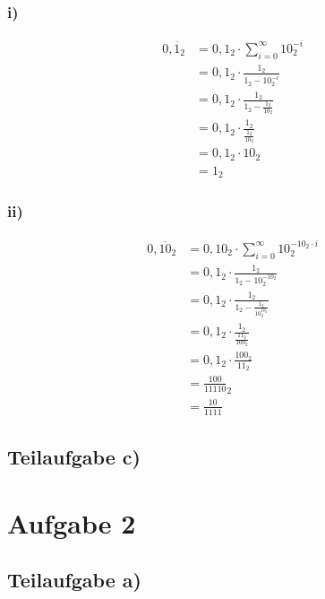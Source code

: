 \documentclass{llncs}
\begin{document}
\subsubsection*{i)}

\begin{align*}
0,\overline{1}_2 &= 0,1_2 \cdot \sum_{i=0}^{\infty} 10^{-i}_2 \\
               &= 0,1_2 \cdot \frac{1_2}{1_2-10^{-i}_2} \\
               &= 0,1_2 \cdot \frac{1_2}{1_2-\frac{1_2}{10_2}} \\
               &= 0,1_2 \cdot \frac{1_2}{\frac{1_2}{10_2}} \\
               &= 0,1_2 \cdot 10_2 \\
               &= 1_2
\end{align*}

\subsubsection*{ii)}

\begin{align*}
0,\overline{10}_2 &= 0,10_2 \cdot \sum_{i=0}^{\infty} 10^{-10_2 \cdot i}_2 \\
                  &= 0,1_2 \cdot \frac{1_2}{1_2-10^{-10_2}_2} \\
                  &= 0,1_2 \cdot \frac{1_2}{1_2-\frac{1_2}{10^{10_2}_2}} \\
                  &= 0,1_2 \cdot \frac{1_2}{\frac{11_2}{100_2}} \\
                  &= 0,1_2 \cdot \frac{100_2}{11_2} \\
                  &= \frac{100}{11110}_2 \\
                  &= \frac{10}{1111}
\end{align*}


\subsection*{Teilaufgabe c)}

\section*{Aufgabe 2}
\subsection*{Teilaufgabe a)}
\end{document}
